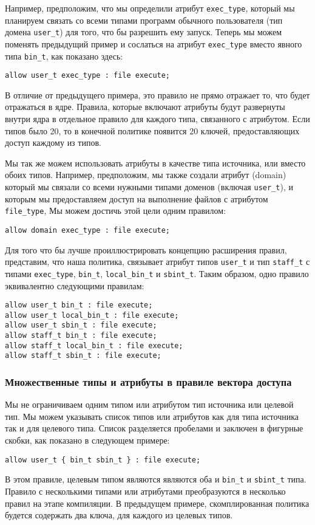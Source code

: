 \documentclass{./../class/UIR}
\begin{document}
    Например, предположим, что мы определили атрибут \verb"exec_type", который
    мы планируем связать со всеми типами программ обычного пользователя (тип
    домена \verb"user_t") для того, что бы разрешить ему запуск. Теперь мы
    можем поменять предыдущий пример и сослаться на атрибут \verb"exec_type"
    вместо явного типа \verb"bin_t", как показано здесь:
\begin{verbatim}
allow user_t exec_type : file execute;
\end{verbatim}
    В отличие от предыдущего примера, это правило не прямо отражает то, что
    будет отражаться в ядре. Правила, которые включают атрибуты будут развернуты
    внутри ядра в отдельное правило для каждого типа, связанного с атрибутом.
    Если типов было 20, то в конечной политике появится 20 ключей,
    предоставляющих доступ каждому из типов.

    Мы так же можем использовать атрибуты в качестве типа источника, или вместо
    обоих типов. Например, предположим, мы также создали атрибут (domain)
    который мы связали со всеми нужными  типами доменов (включая \verb"user_t"),
    и которым мы предоставляем доступ на выполнение файлов с атрибутом
    \verb"file_type", Мы можем достичь этой цели одним правилом:
\begin{verbatim}
allow domain exec_type : file execute;
\end{verbatim}
    Для того что бы лучше проиллюстрировать концепцию расширения правил,
    представим, что наша политика, связывает атрибут типов \verb"user_t" и  тип
    \verb"staff_t" с типами \verb"exec_type", \verb"bin_t",  \verb"local_bin_t"
    и \verb"sbint_t". Таким образом, одно правило эквивалентно следующими
    правилам:
\begin{verbatim}
allow user_t bin_t : file execute;
allow user_t local_bin_t : file execute;
allow user_t sbin_t : file execute;
allow staff_t bin_t : file execute;
allow staff_t local_bin_t : file execute;
allow staff_t sbin_t : file execute;
\end{verbatim}
\subsubsection{Множественные типы и атрибуты в правиле вектора доступа}

    Мы не ограничиваем одним типом или атрибутом тип источника или целевой тип.
    Мы можем указывать список типов или атрибутов как для типа источника так и
    для целевого типа. Список разделяется пробелами и заключен в фигурные
    скобки, как показано в следующем примере:
\begin{verbatim}
allow user_t { bin_t sbin_t } : file execute;
\end{verbatim}
    В этом правиле, целевым типом являются являются оба и \verb"bin_t" и
    \verb"sbint_t" типа. Правило с несколькими типами или атрибутами
    преобразуются в несколько правил на этапе компиляции. В предыдущем примере,
    скомплированная политика будется содержать два ключа, для каждого из целевых
    типов.
\end{document}

